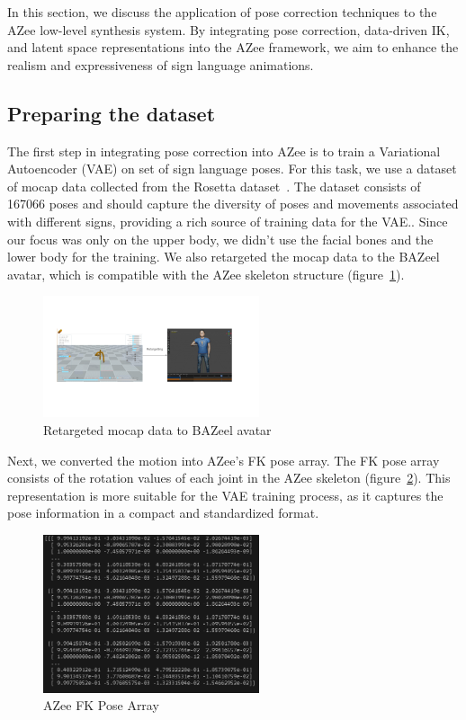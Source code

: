 \documentclass[../../main.tex]{subfiles}
\begin{document}
In this section, we discuss the application of pose correction techniques to the AZee low-level synthesis system. By integrating pose correction, data-driven IK, and latent space representations into the AZee framework, we aim to enhance the realism and expressiveness of sign language animations.

\subsection{Preparing the dataset}
\label{ch:pose_correction:pose_correction_with_azee:dataset}

The first step in integrating pose correction into AZee is to train a Variational Autoencoder (VAE) on set of sign language poses. For this task, we use a dataset of mocap data collected from the Rosetta dataset~\cite{bertin2022rosetta}. The dataset consists of 167066 poses and should capture the diversity of poses and movements associated with different signs, providing a rich source of training data for the VAE.. Since our focus was only on the upper body, we didn't use the facial bones and the lower body for the training. We also retargeted the mocap data to the BAZeel avatar, which is compatible with the AZee skeleton structure (figure~\ref{fig:retargeted}).

\begin{figure}
  \centering \includegraphics[width = 2.5in]{chapters/pose_correction/images/retargeted.png}
  \caption{Retargeted mocap data to BAZeel avatar}
  \label{fig:retargeted}
\end{figure}

Next, we converted the motion into AZee's FK pose array. The FK pose array consists of the rotation values of each joint in the AZee skeleton (figure~\ref{fig:azee_fk_pose}). This representation is more suitable for the VAE training process, as it captures the pose information in a compact and standardized format.

\begin{figure}
  \centering \includegraphics[width = 2.5in]{chapters/pose_correction/images/azee_fk_pose.png}
  \caption{AZee FK Pose Array}
  \label{fig:azee_fk_pose}
\end{figure}
\end{document}
